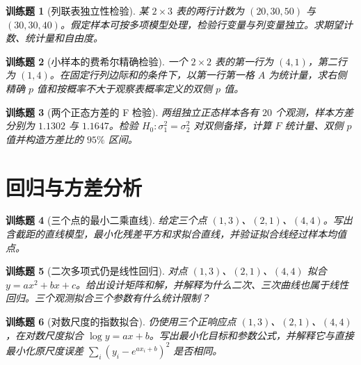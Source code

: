 \documentclass[UTF8,12pt,a4paper,fontset=fandol]{ctexbook}
\newtheorem{exercise}{训练题}[section]
\begin{document}
\begin{exercise}[列联表独立性检验]\label{q:B15.3}
某 $2\times3$ 表的两行计数为 $(20,30,50)$ 与 $(30,30,40)$。假定样本可按多项模型处理，检验行变量与列变量独立。求期望计数、统计量和自由度。\par{}\end{exercise}

\begin{exercise}[小样本的费希尔精确检验]\label{q:B15.4}
一个 $2\times2$ 表的第一行为 $(4,1)$，第二行为 $(1,4)$。在固定行列边际和的条件下，以第一行第一格 $A$ 为统计量，求右侧精确 $p$ 值和按概率不大于观察表概率定义的双侧 $p$ 值。\par{}\end{exercise}

\begin{exercise}[两个正态方差的 F 检验]\label{q:M-P9-5}
两组独立正态样本各有 $20$ 个观测，样本方差分别为 $1.1302$ 与 $1.1647$。检验 $H_0:\sigma_1^2=\sigma_2^2$ 对双侧备择，计算 $F$ 统计量、双侧 $p$ 值并构造方差比的 $95\%$ 区间。\par{}\end{exercise}

\clearpage\section{回归与方差分析}

\begin{exercise}[三个点的最小二乘直线]\label{q:M-C26-1a}
给定三个点 $(1,3)$、$(2,1)$、$(4,4)$。写出含截距的直线模型，最小化残差平方和求拟合直线，并验证拟合线经过样本均值点。\par{}\end{exercise}

\begin{exercise}[二次多项式仍是线性回归]\label{q:M-C26-1b}
对点 $(1,3)$、$(2,1)$、$(4,4)$ 拟合 $y=ax^2+bx+c$。给出设计矩阵和解，并解释为什么二次、三次曲线也属于线性回归。三个观测拟合三个参数有什么统计限制？\par{}\end{exercise}

\begin{exercise}[对数尺度的指数拟合]\label{q:M-C26-1c}
仍使用三个正响应点 $(1,3)$、$(2,1)$、$(4,4)$，在对数尺度拟合 $\log y=ax+b$。写出最小化目标和参数公式，并解释它与直接最小化原尺度误差 $\sum_i(y_i-e^{ax_i+b})^2$ 是否相同。\par{}\end{exercise}
\end{document}
